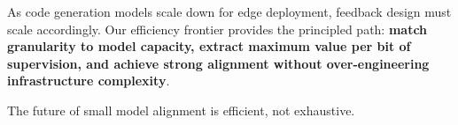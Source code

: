 As code generation models scale down for edge deployment, feedback design must scale accordingly. Our efficiency frontier provides the principled path: \textbf{match granularity to model capacity, extract maximum value per bit of supervision, and achieve strong alignment without over-engineering infrastructure complexity}.

The future of small model alignment is efficient, not exhaustive.
